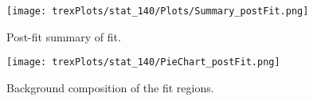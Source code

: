 \begin{figure}[h!]
    \center
    \texttt{[image: trexPlots/stat\_140/Plots/Summary\_postFit.png]}
    \caption{Post-fit summary of fit.}
    \label{fig:Summary140}
\end{figure}

\begin{figure}[h!]
    \centering                                                                                                               
    \texttt{[image: trexPlots/stat\_140/PieChart\_postFit.png]}
    \caption{Background composition of the fit regions.}
    \label{fig:pieChart140}
\end{figure}

